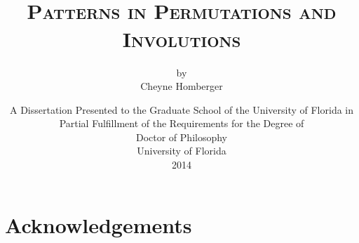 \documentclass[10pt,twoside]{memoir}
\begin{document}
\thispagestyle{empty}


\pretitle{ \begin{center}}
\title{\vspace{-6pc} \hrulefill \\ {\scshape \LARGE Patterns in Permutations and
    Involutions\\[6pt]}}
\author{{\small by} \\[4pc] Cheyne Homberger}
\predate{\vfill\begin{center}\normalsize}


\date{\vspace{4pc} A Dissertation Presented to the Graduate School of the University
of Florida in Partial Fulfillment of the Requirements for the Degree of \\
Doctor of Philosophy \\[1pc]
University of Florida \\[1pc]
2014}
\maketitle
\thispagestyle{empty}


\cleardoublepage 

\thispagestyle{empty}

\begin{center} \itshape
  \vspace*{.4\textheight}
  
\end{center}
\cleardoublepage

\frontmatter

\cleardoublepage

\chapter*{Acknowledgements}


\cleardoublepage

\tableofcontents

\cleardoublepage

\listoftables

\cleardoublepage

\listoffigures

\newpage
\end{document}
